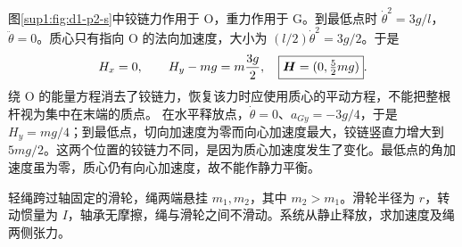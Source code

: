 \begin{solution}
图\ref{sup1:fig:d1-p2-s}中铰链力作用于 O，重力作用于 G。到最低点时 $\dot\theta^2=3g/l$，$\ddot\theta=0$。质心只有指向 O 的法向加速度，大小为 $(l/2)\dot\theta^2=3g/2$。于是
\[
H_x=0,\qquad H_y-mg=m\frac{3g}{2},
\quad\boxed{\bm{H}=(0,\tfrac52mg)}.
\]
绕 O 的能量方程消去了铰链力，恢复该力时应使用质心的平动方程，不能把整根杆视为集中在末端的质点。
在水平释放点，$\dot\theta=0$、$a_{Gy}=-3g/4$，于是 $H_y=mg/4$；到最低点，切向加速度为零而向心加速度最大，铰链竖直力增大到 $5mg/2$。这两个位置的铰链力不同，是因为质心加速度发生了变化。最低点的角加速度虽为零，质心仍有向心加速度，故不能作静力平衡。

\end{solution}


\begin{exercise}[有转动惯量的滑轮]\label{sup1:problem-exercise-6}\label{sup1:exercise:d1-p6}
轻绳跨过轴固定的滑轮，绳两端悬挂 $m_1,m_2$，其中 $m_2>m_1$。滑轮半径为 $r$，转动惯量为 $I$，轴承无摩擦，绳与滑轮之间不滑动。系统从静止释放，求加速度及绳两侧张力。
\end{exercise}

